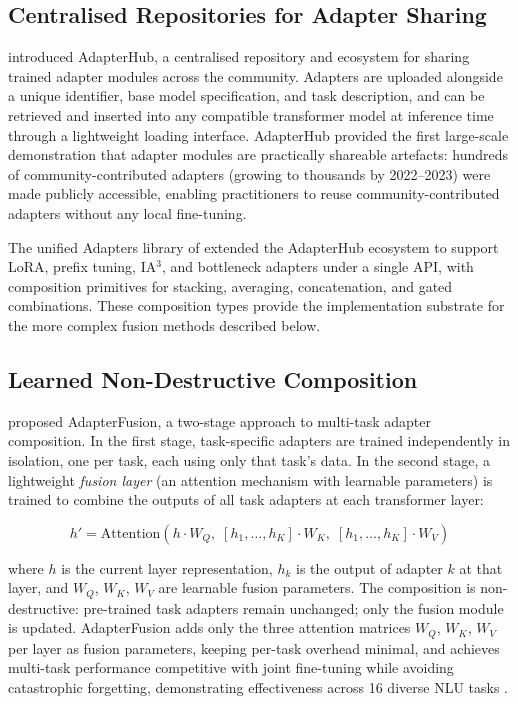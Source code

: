 \subsection{Centralised Repositories for Adapter Sharing}
\label{sec:adapter_composition:hub}

\citet{Pfeiffer2020hub} introduced AdapterHub, a centralised repository and ecosystem for
sharing trained adapter modules across the community. Adapters are uploaded alongside a
unique identifier, base model specification, and task description, and can be retrieved
and inserted into any compatible transformer model at inference time through a
lightweight loading interface. AdapterHub provided the first large-scale demonstration
that adapter modules are practically shareable artefacts: hundreds of community-contributed
adapters (growing to thousands by 2022--2023) were made publicly accessible, enabling practitioners to
reuse community-contributed adapters without any local fine-tuning.

The unified Adapters library of \citet{PothAdapters2023} extended the AdapterHub
ecosystem to support LoRA, prefix tuning, IA$^3$, and bottleneck adapters under a single
API, with composition primitives for stacking, averaging, concatenation, and gated
combinations. These composition types provide the implementation substrate for the
more complex fusion methods described below.

\subsection{Learned Non-Destructive Composition}
\label{sec:adapter_composition:fusion}

\citet{Pfeiffer2021fusion} proposed AdapterFusion, a two-stage approach to multi-task
adapter composition. In the first stage, task-specific adapters are trained independently
in isolation, one per task, each using only that task's data. In the second stage,
a lightweight \textit{fusion layer} (an attention mechanism with learnable parameters) is trained to combine the outputs of all task adapters at each transformer layer:

\begin{equation}
h' = \mathrm{Attention}(h \cdot W_Q,\; [h_1, \ldots, h_K] \cdot W_K,\; [h_1, \ldots, h_K] \cdot W_V)
\label{eq:adapterfusion}
\end{equation}

where $h$ is the current layer representation, $h_k$ is the output of adapter $k$ at
that layer, and $W_Q$, $W_K$, $W_V$ are learnable fusion parameters. The composition
is non-destructive: pre-trained task adapters remain unchanged; only the fusion module
is updated. AdapterFusion adds only the three attention matrices $W_Q$, $W_K$, $W_V$ per layer as fusion parameters, keeping per-task overhead minimal, and achieves multi-task performance
competitive with joint fine-tuning while avoiding catastrophic forgetting, demonstrating
effectiveness across 16 diverse NLU tasks \citep{Pfeiffer2021fusion}.

